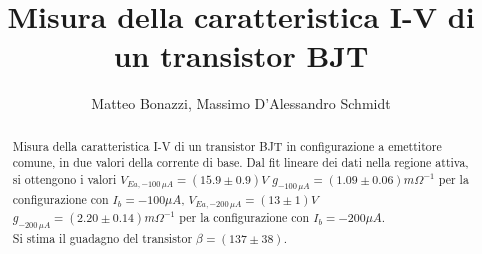 \documentclass{article}
\title{Misura della caratteristica I-V di un transistor BJT}
\author{Matteo Bonazzi, Massimo D'Alessandro Schmidt}
\begin{document}
\maketitle
\begin{abstract}
    Misura della caratteristica I-V di un transistor BJT in configurazione a emettitore comune, in due valori della corrente di base.\newline
    Dal fit lineare dei dati nella regione attiva, si ottengono i valori $V_{Ea,-100 \,\mu A}=(15.9\pm 0.9) V$ $g_{-100 \,\mu A}=(1.09 \pm 0.06) m\Omega^{-1} $ per la configurazione con $I_b=-100 \mu A$, $V_{Ea,-200 \,\mu A}=(13\pm 1) V $ $g_{-200 \,\mu A}=(2.20 \pm 0.14) m\Omega^{-1}$ per la configurazione con $I_b=-200 \mu A$.\\
    Si stima il guadagno del transistor $\beta=(137\pm38)$.\\
\end{abstract}
\end{document}
